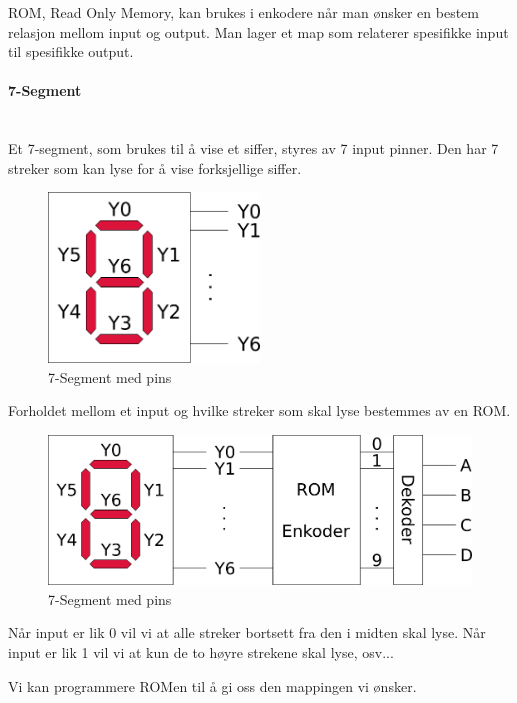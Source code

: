 ROM, Read Only Memory, kan brukes i enkodere når man ønsker en bestem relasjon
mellom input og output.
Man lager et map som relaterer spesifikke input til spesifikke output.

\paragraph{7-Segment} \mbox{} \\
Et 7-segment, som brukes til å vise et siffer, styres av 7 input pinner.
Den har 7 streker som kan lyse for å vise forksjellige siffer.

\begin{figure}[H]
  \caption{7-Segment med pins}
  \centering
  \includegraphics[width=0.5\textwidth]{./img/7-segment}
\end{figure}

Forholdet mellom et input og hvilke streker som skal lyse bestemmes av en ROM.

\begin{figure}[H]
  \caption{7-Segment med pins}
  \centering
  \includegraphics[width=\textwidth]{./img/7-segment-rom}
\end{figure}

Når input er lik 0 vil vi at alle streker bortsett fra den i midten skal lyse.
Når input er lik 1 vil vi at kun de to høyre strekene skal lyse, osv...

Vi kan programmere ROMen til å gi oss den mappingen vi ønsker.

